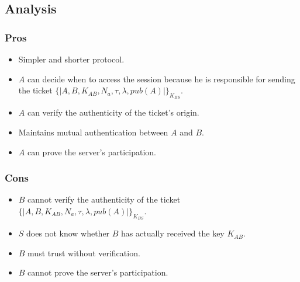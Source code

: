 \subsection{Analysis}
\subsubsection{Pros}
\begin{itemize}
    \item Simpler and shorter protocol.
    \item $A$ can decide when to access the session because he is responsible for sending the ticket $\{|A,B,K_{AB},N_a, \tau, \lambda, pub(A) |\}_{K_{BS}}$.
    \item $A$ can verify the authenticity of the ticket’s origin.
    \item Maintains mutual authentication between $A$ and $B$.
    \item $A$ can prove the server’s participation.
\end{itemize}

\subsubsection{Cons}
\begin{itemize}
    \item $B$ cannot verify the authenticity of the ticket $\{|A,B,K_{AB},N_a, \tau, \lambda, pub(A) |\}_{K_{BS}}$.
    \item $S$ does not know whether $B$ has actually received the key $K_{AB}$.
    \item $B$ must trust without verification.
    \item $B$ cannot prove the server’s participation.
\end{itemize}
